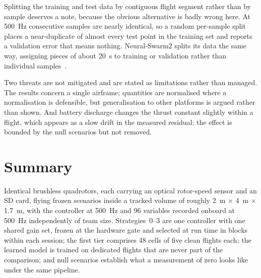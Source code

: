 Splitting the training and test data by contiguous flight segment rather than by sample deserves a
note, because the obvious alternative is badly wrong here. At \SI{500}{\hertz} consecutive samples
are nearly identical, so a random per-sample split places a near-duplicate of almost every test
point in the training set and reports a validation error that means nothing. Neural-Swarm2 splits
its data the same way, assigning pieces of about \SI{20}{\second} to training or validation rather
than individual samples~\cite{shi2022neuralswarm2}.

Two threats are not mitigated and are stated as limitations rather than managed. The results
concern a single airframe; quantities are normalised where a normalisation is defensible, but
generalisation to other platforms is argued rather than shown. And battery discharge changes the
thrust constant slightly within a flight, which appears as a slow drift in the measured residual;
the effect is bounded by the null scenarios but not removed.

\section{Summary}
\label{sec:setup-summary}

Identical brushless quadrotors, each carrying an optical rotor-speed sensor and an SD card, flying
frozen scenarios inside a tracked volume of roughly \SI{2}{\metre} $\times$ \SI{4}{\metre} $\times$
\SI{1.7}{\metre}, with the controller at \SI{500}{\hertz} and \num{96} variables recorded onboard at
\SI{500}{\hertz} independently of team size. Strategies~0--3 are one controller with one shared gain
set, frozen at the hardware gate and selected at run time in blocks within each session; the first
tier comprises 48 cells of five clean flights each; the learned model is trained on dedicated
flights that are never part of the comparison; and null scenarios establish what a measurement of
zero looks like under the same pipeline.

